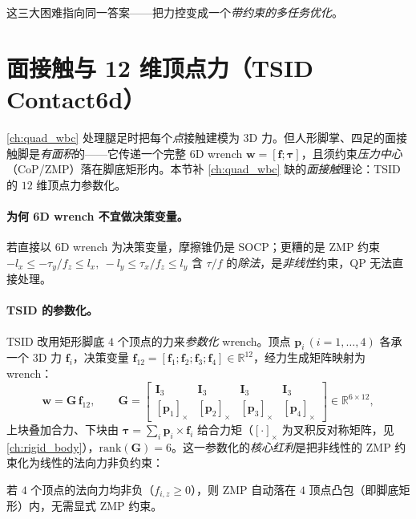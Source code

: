 这三大困难指向同一答案——把力控变成一个\emph{带约束的多任务优化}。

\section{面接触与 12 维顶点力（TSID Contact6d）}
\label{sec:fw-contact6d}

\cref{ch:quad_wbc} 处理腿足时把每个\emph{点}接触建模为 $3$D 力。但人形脚掌、四足的面接触脚是\emph{有面积}的——它传递一个完整 $6$D wrench $\mathbf{w}=[\mathbf{f};\boldsymbol{\tau}]$，且须约束\emph{压力中心}（CoP/ZMP）落在脚底矩形内。本节补 \cref{ch:quad_wbc} 缺的\emph{面接触}理论：TSID 的 $12$ 维顶点力参数化。

\paragraph{为何 6D wrench 不宜做决策变量。}
若直接以 $6$D wrench 为决策变量，摩擦锥仍是 SOCP；更糟的是 ZMP 约束 $-l_x\le-\tau_y/f_z\le l_x,\ -l_y\le\tau_x/f_z\le l_y$ 含 $\tau/f$ 的\emph{除法}，是\emph{非线性}约束，QP 无法直接处理。

\paragraph{TSID 的参数化。}
TSID 改用矩形脚底 $4$ 个顶点的力来\emph{参数化} wrench。顶点 $\mathbf{p}_i\,(i=1,\dots,4)$ 各承一个 $3$D 力 $\mathbf{f}_i$，决策变量 $\mathbf{f}_{12}=[\mathbf{f}_1;\mathbf{f}_2;\mathbf{f}_3;\mathbf{f}_4]\in\mathbb{R}^{12}$，经力生成矩阵映射为 wrench：
\begin{equation}
  \mathbf{w}=\mathbf{G}\,\mathbf{f}_{12},\qquad
  \mathbf{G}=\begin{bmatrix}\mathbf{I}_3 & \mathbf{I}_3 & \mathbf{I}_3 & \mathbf{I}_3\\[2pt] [\mathbf{p}_1]_\times & [\mathbf{p}_2]_\times & [\mathbf{p}_3]_\times & [\mathbf{p}_4]_\times\end{bmatrix}\in\mathbb{R}^{6\times12},
  \label{eq:fw-G}
\end{equation}
上块叠加合力、下块由 $\boldsymbol{\tau}=\sum_i\mathbf{p}_i\times\mathbf{f}_i$ 给合力矩（$[\cdot]_\times$ 为叉积反对称矩阵，见 \cref{ch:rigid_body}），$\mathrm{rank}(\mathbf{G})=6$。这一参数化的\emph{核心红利}是把非线性的 ZMP 约束化为线性的法向力非负约束：

\begin{theorem}
\label{thm:fw-zmp}
若 $4$ 个顶点的法向力均非负（$f_{i,z}\ge0$），则 ZMP 自动落在 $4$ 顶点凸包（即脚底矩形）内，无需显式 ZMP 约束。
\end{theorem}


